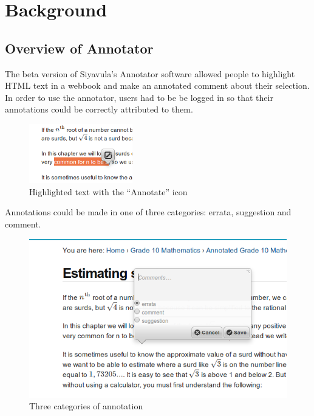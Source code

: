 
\chapter{Background} %

\label{Chapter2} %



\section{Overview of Annotator}
The beta version of Siyavula's Annotator software allowed people to highlight HTML text in a webbook and make an annotated comment about their selection. In order to use the annotator, users had to be be logged in so that their annotations could be correctly attributed to them. 

\begin{figure}[h]
    \centering
    \includegraphics[width=0.4\textwidth]{Figures/annotator1.png}
 \caption{Highlighted text with the ``Annotate'' icon}
\end{figure}

Annotations could be made in one of three categories: errata, suggestion and comment.
\begin{figure}[h]
    \centering
    \includegraphics[width=\textwidth]{Figures/annotatorcategories.png}
 \caption{Three categories of annotation}
\end{figure}

